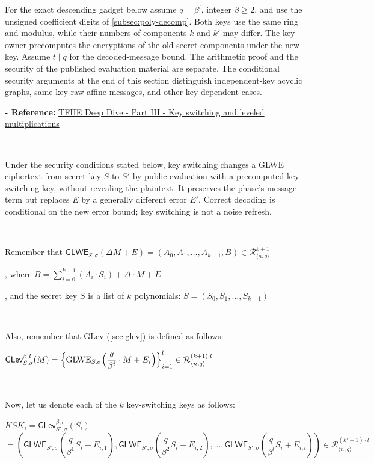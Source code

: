 For the exact descending gadget below assume $q=\beta^l$, integer $\beta\ge2$, and use the unsigned coefficient digits of \autoref{subsec:poly-decomp}. Both keys use the same ring and modulus, while their numbers of components $k$ and $k'$ may differ. The key owner precomputes the encryptions of the old secret components under the new key. Assume $t\mid q$ for the decoded-message bound. The arithmetic proof and the security of the published evaluation material are separate. The conditional security arguments at the end of this section distinguish independent-key acyclic graphs, same-key raw affine messages, and other key-dependent cases.

\textbf{- Reference:} 
\href{https://www.zama.ai/post/tfhe-deep-dive-part-3}{TFHE Deep Dive - Part III - Key switching and leveled multiplications}~\cite{tfhe-3}

$ $

Under the security conditions stated below, key switching changes a GLWE ciphertext from secret key $S$ to $S'$ by public evaluation with a precomputed key-switching key, without revealing the plaintext. It preserves the phase's message term but replaces $E$ by a generally different error $E'$. Correct decoding is conditional on the new error bound; key switching is not a noise refresh.

$ $

\noindent Remember that $\textsf{GLWE}_{S,\sigma}(\Delta M + E) = (A_0, A_1, \ldots , A_{k-1}, B) \in \mathcal{R}_{\langle n, q \rangle }^{k + 1}$

, where $B = \sum\limits_{i=0}^{k-1}{(A_i \cdot S_i)} + \Delta \cdot M + E$

, and the secret key $S$ is a list of $k$ polynomials: $S = (S_0, S_1, \ldots, S_{k-1})$

$ $

\noindent Also, remember that GLev (\autoref{sec:glev}) is defined as follows: 

$\textsf{GLev}_{S, \sigma}^{\beta, l}(M) = \Bigl \{\text{GLWE}_{S, \sigma}\Bigl (\dfrac{q}{\beta^i} \cdot M + E_i \Bigr ) \Bigr \}_{i=1}^{l} \in \mathcal{R}_{\langle n, q \rangle }^{(k+1) \cdot l}$

$ $

\noindent Now, let us denote each of the $k$ key-switching keys as follows:

$\mathit{KSK}_i = \textsf{GLev}_{S', \sigma}^{\beta, l}(S_i)$ \\
$ = \left ( \textsf{GLWE}_{S', \sigma} \left ( 
 \dfrac{q}{\beta^1}S_i + E_{i, 1}\right ), \textsf{GLWE}_{S', \sigma} \left ( 
 \dfrac{q}{\beta^2}S_i + E_{i, 2}\right ), \ldots, \textsf{GLWE}_{S', \sigma} \left ( 
 \dfrac{q}{\beta^l}S_i  + E_{i, l} \right) \right ) \in \mathcal{R}_{\langle n, q \rangle }^{(k' + 1) \cdot l}$

